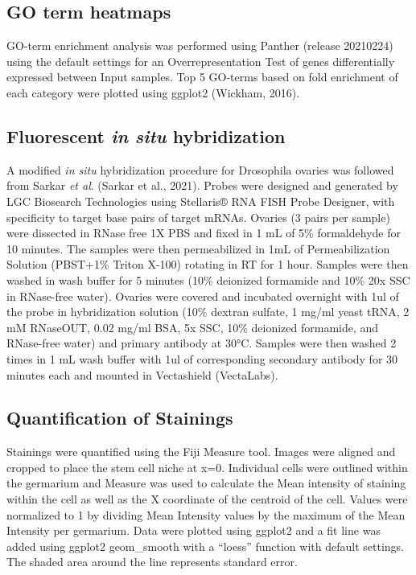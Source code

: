 \documentclass[12pt,oneside]{reedthesis}
\begin{document}
\hypertarget{go-term-heatmaps}{%
\subsection{GO term heatmaps}\label{go-term-heatmaps}}

GO-term enrichment analysis was performed using Panther (release
20210224) using the default settings for an Overrepresentation Test of
genes differentially expressed between Input samples. Top 5 GO-terms
based on fold enrichment of each category were plotted using ggplot2
(Wickham, 2016).

\hypertarget{fluorescent-in-situ-hybridization}{%
\subsection{\texorpdfstring{Fluorescent \emph{in situ} hybridization}{Fluorescent in situ hybridization}}\label{fluorescent-in-situ-hybridization}}

A modified \emph{in situ} hybridization procedure for Drosophila ovaries was
followed from Sarkar \emph{et al}.
(Sarkar et al., 2021). Probes were designed and
generated by LGC Biosearch Technologies using Stellaris® RNA FISH Probe
Designer, with specificity to target base pairs of target mRNAs. Ovaries
(3 pairs per sample) were dissected in RNase free 1X PBS and fixed in 1
mL of 5\% formaldehyde for 10 minutes. The samples were then
permeabilized in 1mL of Permeabilization Solution (PBST+1\% Triton X-100)
rotating in RT for 1 hour. Samples were then washed in wash buffer for 5
minutes (10\% deionized formamide and 10\% 20x SSC in RNase-free water).
Ovaries were covered and incubated overnight with 1ul of the probe in
hybridization solution (10\% dextran sulfate, 1 mg/ml yeast tRNA, 2 mM
RNaseOUT, 0.02 mg/ml BSA, 5x SSC, 10\% deionized formamide, and
RNase-free water) and primary antibody at 30°C. Samples were then washed
2 times in 1 mL wash buffer with 1ul of corresponding secondary antibody
for 30 minutes each and mounted in Vectashield (VectaLabs).

\hypertarget{quantification-of-stainings}{%
\subsection{Quantification of Stainings}\label{quantification-of-stainings}}

Stainings were quantified using the Fiji Measure tool. Images were
aligned and cropped to place the stem cell niche at x=0. Individual
cells were outlined within the germarium and Measure was used to
calculate the Mean intensity of staining within the cell as well as the
X coordinate of the centroid of the cell. Values were normalized to 1 by
dividing Mean Intensity values by the maximum of the Mean Intensity per
germarium. Data were plotted using ggplot2 and a fit line was added
using ggplot2 geom\_smooth with a ``loess'' function with default settings.
The shaded area around the line represents standard error.
\end{document}
